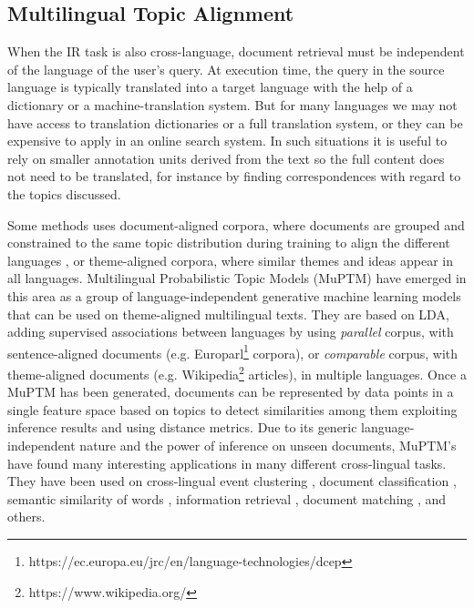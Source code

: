 \subsection{Multilingual Topic Alignment}

When the IR task is also cross-language, document retrieval must be independent of the language of the user's query. At execution time, the query in the source language is typically translated into a target language with the help of a dictionary or a machine-translation system. But for many languages we may not have access to translation dictionaries or a full translation system, or they can be expensive to apply in an online search system. In such situations it is useful to rely on smaller annotation units derived from the text so the full content does not need to be translated, for instance by finding correspondences with regard to the topics discussed.

Some methods uses document-aligned corpora, where documents are grouped and constrained to the same topic distribution during training to align the different languages \citep{Smet2009, mimno-etal-2009-polylingual, Ni2009, Fukumasu2012, Zhang2013}, or theme-aligned corpora, where similar themes and ideas appear in all languages\citep{Graber2009}. Multilingual Probabilistic Topic Models (MuPTM) \citep{Vulic2015} have emerged in this area as a group of language-independent generative machine learning models that can be used on theme-aligned multilingual texts. They are based on LDA, adding supervised associations between languages by using \textit{parallel} corpus, with sentence-aligned documents (e.g. Europarl\footnote{https://ec.europa.eu/jrc/en/language-technologies/dcep} corpora), or \textit{comparable} corpus, with theme-aligned documents (e.g. Wikipedia\footnote{https://www.wikipedia.org/} articles), in multiple languages. Once a MuPTM has been generated, documents can be represented by data points in a single feature space based on topics to detect similarities among them exploiting inference results and using distance metrics. Due to its generic language-independent nature and the power of inference on unseen documents, MuPTM's have found many interesting applications in many different cross-lingual tasks. They have been used on cross-lingual event clustering \citep{DeSmet2009}, document classification \citep{10.1007/978-3-642-20841-6_45, Ni:2011:CLT:1935826.1935887},  semantic similarity of words \citep{Mimno:2009:PTM:1699571.1699627, Vulic:2012:DHC:2380816.2380872}, information retrieval \citep{10.1007/978-3-642-36973-5_9, ganguly-etal-2012-cross}, document matching \citep{Platt:2010:TDR:1870658.1870683, zhu-etal-2013-building}, and others. 

